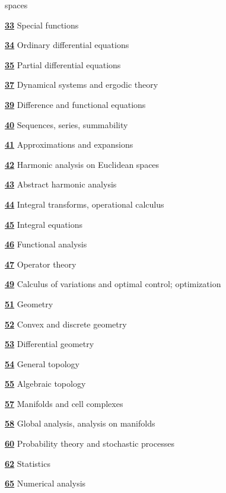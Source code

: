 \documentclass[letterpaper]{article}
\begin{document}
\begin{multicols}{2}
\begin{description}
spaces  
\item []\hyperref[33-XX]{\textbf{33}}  Special functions 
\item []\hyperref[34-XX]{\textbf{34}}  Ordinary differential equations 
\item []\hyperref[35-XX]{\textbf{35}}  Partial differential equations 
\item []\hyperref[37-XX]{\textbf{37}}  Dynamical systems and ergodic theory  
\item []\hyperref[39-XX]{\textbf{39}}  Difference and functional equations 
\item []\hyperref[40-XX]{\textbf{40}}  Sequences, series, summability 
\item []\hyperref[41-XX]{\textbf{41}}  Approximations and expansions  
\item []\hyperref[42-XX]{\textbf{42}}  Harmonic analysis on Euclidean spaces 
\item []\hyperref[43-XX]{\textbf{43}}  Abstract harmonic analysis  
\item []\hyperref[44-XX]{\textbf{44}}  Integral transforms, operational calculus 
\item []\hyperref[45-XX]{\textbf{45}}  Integral equations 
\item []\hyperref[46-XX]{\textbf{46}}  Functional analysis 
\item []\hyperref[47-XX]{\textbf{47}}  Operator theory 
\item []\hyperref[49-XX]{\textbf{49}}  Calculus of variations and optimal 
control; 
optimization
\item []\hyperref[51-XX]{\textbf{51}}  Geometry  
\item []\hyperref[52-XX]{\textbf{52}}  Convex and discrete geometry 
\item []\hyperref[53-XX]{\textbf{53}}  Differential geometry  
\item []\hyperref[54-XX]{\textbf{54}}  General topology  
\item []\hyperref[55-XX]{\textbf{55}}  Algebraic topology 
\item []\hyperref[57-XX]{\textbf{57}}  Manifolds and cell complexes  
\item []\hyperref[58-XX]{\textbf{58}}  Global analysis, analysis on manifolds 
\item []\hyperref[60-XX]{\textbf{60}}  Probability theory and stochastic 
processes  
\item []\hyperref[62-XX]{\textbf{62}}  Statistics 
\item []\hyperref[65-XX]{\textbf{65}}  Numerical analysis 

\end{description}
\end{multicols}
\end{document}
